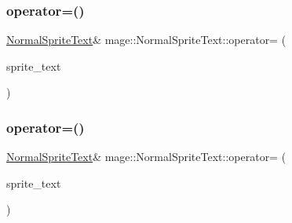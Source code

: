 \subsubsection{\texorpdfstring{operator=()}{operator=()}\hspace{0.1cm}{\footnotesize\ttfamily [1/2]}}
{\footnotesize\ttfamily \hyperlink{classmage_1_1_normal_sprite_text}{Normal\+Sprite\+Text}\& mage\+::\+Normal\+Sprite\+Text\+::operator= (\begin{DoxyParamCaption}\item[{const \hyperlink{classmage_1_1_normal_sprite_text}{Normal\+Sprite\+Text} \&}]{sprite\+\_\+text }\end{DoxyParamCaption})\hspace{0.3cm}{\ttfamily [default]}}

\hypertarget{classmage_1_1_normal_sprite_text_a034dd8c1c084216a247896ffbe50e61d}{}\label{classmage_1_1_normal_sprite_text_a034dd8c1c084216a247896ffbe50e61d} 
\subsubsection{\texorpdfstring{operator=()}{operator=()}\hspace{0.1cm}{\footnotesize\ttfamily [2/2]}}
{\footnotesize\ttfamily \hyperlink{classmage_1_1_normal_sprite_text}{Normal\+Sprite\+Text}\& mage\+::\+Normal\+Sprite\+Text\+::operator= (\begin{DoxyParamCaption}\item[{\hyperlink{classmage_1_1_normal_sprite_text}{Normal\+Sprite\+Text} \&\&}]{sprite\+\_\+text }\end{DoxyParamCaption})\hspace{0.3cm}{\ttfamily [default]}}

